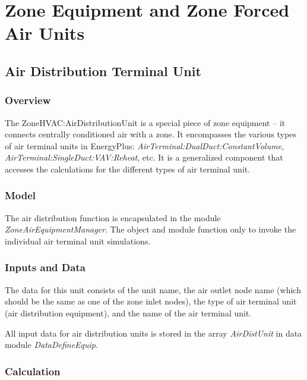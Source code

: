 \section{Zone Equipment and Zone Forced Air Units }\label{zone-equipment-and-zone-forced-air-units}

\subsection{Air Distribution Terminal Unit}\label{air-distribution-terminal-unit}

\subsubsection{Overview}\label{overview-031}

The ZoneHVAC:AirDistributionUnit is a special piece of zone equipment -- it connects centrally conditioned air with a zone. It encompasses the various types of air terminal units in EnergyPlus: \emph{AirTerminal:DualDuct:ConstantVolume}, \emph{AirTerminal:SingleDuct:VAV:Reheat}, etc. It is a generalized component that accesses the calculations for the different types of air terminal unit.

\subsubsection{Model}\label{model-003}

The air distribution function is encapsulated in the module \emph{ZoneAirEquipmentManager}. The object and module function only to invoke the individual air terminal unit simulations.

\subsubsection{Inputs and Data}\label{inputs-and-data-003}

The data for this unit consists of the unit name, the air outlet node name (which should be the same as one of the zone inlet nodes), the type of air terminal unit (air distribution equipment), and the name of the air terminal unit.

All input data for air distribution units is stored in the array \emph{AirDistUnit} in data module \emph{DataDefineEquip}.

\subsubsection{Calculation}\label{calculation-001}

